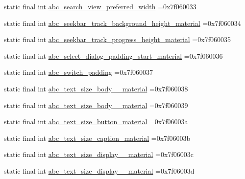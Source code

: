 \begin{DoxyCompactItemize}
\item 
static final int \mbox{\hyperlink{classbr_1_1unb_1_1cic_1_1mp_1_1marketmaster_1_1R_1_1dimen_a149b6f165068b63cca35cfb56277a50c}{abc\+\_\+search\+\_\+view\+\_\+preferred\+\_\+width}} =0x7f060033
\item 
static final int \mbox{\hyperlink{classbr_1_1unb_1_1cic_1_1mp_1_1marketmaster_1_1R_1_1dimen_a5bde57de0378dd494f2d2de131940972}{abc\+\_\+seekbar\+\_\+track\+\_\+background\+\_\+height\+\_\+material}} =0x7f060034
\item 
static final int \mbox{\hyperlink{classbr_1_1unb_1_1cic_1_1mp_1_1marketmaster_1_1R_1_1dimen_a5034fa5c26c91bdfe0350f9f289fc69e}{abc\+\_\+seekbar\+\_\+track\+\_\+progress\+\_\+height\+\_\+material}} =0x7f060035
\item 
static final int \mbox{\hyperlink{classbr_1_1unb_1_1cic_1_1mp_1_1marketmaster_1_1R_1_1dimen_a0307a2d1d793d096c30c1d70b5b457dc}{abc\+\_\+select\+\_\+dialog\+\_\+padding\+\_\+start\+\_\+material}} =0x7f060036
\item 
static final int \mbox{\hyperlink{classbr_1_1unb_1_1cic_1_1mp_1_1marketmaster_1_1R_1_1dimen_ae44f1ad473488ba3fd9c8a3ae7055413}{abc\+\_\+switch\+\_\+padding}} =0x7f060037
\item 
static final int \mbox{\hyperlink{classbr_1_1unb_1_1cic_1_1mp_1_1marketmaster_1_1R_1_1dimen_a984018f3f1dab0572e2d669d028fcc19}{abc\+\_\+text\+\_\+size\+\_\+body\+\_\+\_\+material}} =0x7f060038
\item 
static final int \mbox{\hyperlink{classbr_1_1unb_1_1cic_1_1mp_1_1marketmaster_1_1R_1_1dimen_a1cbb60fc0e1f7c7d7df4ba7afaec2182}{abc\+\_\+text\+\_\+size\+\_\+body\+\_\+\_\+material}} =0x7f060039
\item 
static final int \mbox{\hyperlink{classbr_1_1unb_1_1cic_1_1mp_1_1marketmaster_1_1R_1_1dimen_a69f8622238a71dbe725bf478aed25f1e}{abc\+\_\+text\+\_\+size\+\_\+button\+\_\+material}} =0x7f06003a
\item 
static final int \mbox{\hyperlink{classbr_1_1unb_1_1cic_1_1mp_1_1marketmaster_1_1R_1_1dimen_af69d8d416868d0115ca7004c9b3c8040}{abc\+\_\+text\+\_\+size\+\_\+caption\+\_\+material}} =0x7f06003b
\item 
static final int \mbox{\hyperlink{classbr_1_1unb_1_1cic_1_1mp_1_1marketmaster_1_1R_1_1dimen_a10084fe367c4c9794153ffdb77e98ded}{abc\+\_\+text\+\_\+size\+\_\+display\+\_\+\_\+material}} =0x7f06003c
\item 
static final int \mbox{\hyperlink{classbr_1_1unb_1_1cic_1_1mp_1_1marketmaster_1_1R_1_1dimen_a5b3d713c89304c3ef7b7f1e87bd2d8da}{abc\+\_\+text\+\_\+size\+\_\+display\+\_\+\_\+material}} =0x7f06003d

\end{DoxyCompactItemize}
